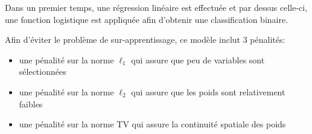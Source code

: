 % 
%  
% 
% 
% 

Dans un premier temps, une régression linéaire est effectuée et par dessus celle-ci, une fonction logistique est appliquée afin d'obtenir une classification binaire.

Afin d'éviter le problème de sur-apprentissage, ce modèle inclut 3 pénalités:
\begin{itemize}
 \item une pénalité sur la norme $\ell_1$ qui assure que peu de variables sont sélectionnées
 \item une pénalité sur la norme $\ell_2$ qui assure que les poids sont relativement faibles
 \item une pénalité sur la norme TV qui assure la continuité spatiale des poids  
\end{itemize}

